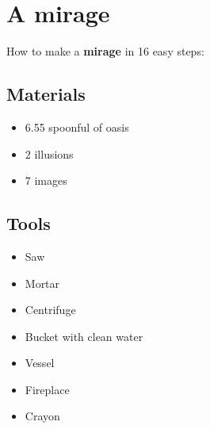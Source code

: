 \documentclass{article}
\begin{document}
\section{A mirage}How to make a \textbf{mirage} in 16 easy steps:

\subsection{Materials}\begin{itemize}
\item 
6.55 spoonful of oasis
\item 
2 illusions
\item 
7 images
\end{itemize}
\subsection{Tools}\begin{itemize}
\item 
Saw
\item 
Mortar
\item 
Centrifuge
\item 
Bucket with clean water
\item 
Vessel
\item 
Fireplace
\item 
Crayon
\end{itemize}
\end{document}
